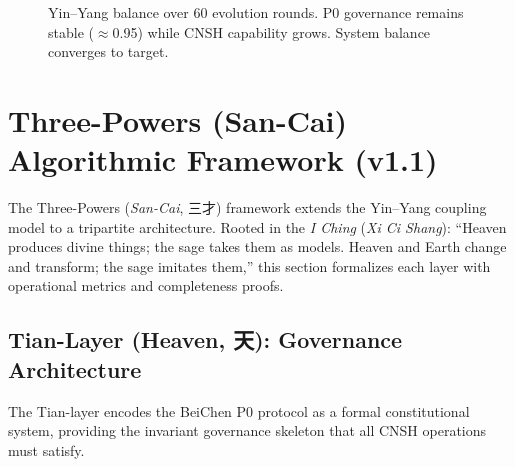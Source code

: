 \documentclass[conference]{IEEEtran}
\begin{document}
\begin{figure}[t]
\centering
{}
\caption{Yin--Yang balance over 60 evolution rounds.
  P0 governance remains stable ($\approx$0.95) while
  CNSH capability grows. System balance converges to target.}
\label{fig:balance}
\end{figure}

\section{Three-Powers (San-Cai) Algorithmic Framework (v1.1)}

The Three-Powers (\emph{San-Cai}, 三才) framework extends the
Yin--Yang coupling model to a tripartite architecture.
Rooted in the \emph{I Ching} (\emph{Xi Ci Shang}):
``Heaven produces divine things; the sage takes them as models.
Heaven and Earth change and transform; the sage imitates them,''
this section formalizes each layer with operational metrics
and completeness proofs.

\subsection{Tian-Layer (Heaven, 天): Governance Architecture}

The Tian-layer encodes the BeiChen P0 protocol as a formal
constitutional system, providing the invariant governance
skeleton that all CNSH operations must satisfy.
\end{document}
